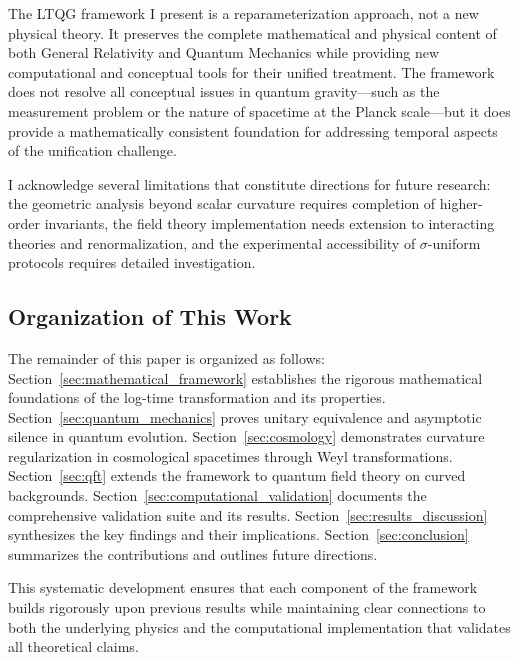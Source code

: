 The LTQG framework I present is a reparameterization approach, not a new physical theory. It preserves the complete mathematical and physical content of both General Relativity and Quantum Mechanics while providing new computational and conceptual tools for their unified treatment. The framework does not resolve all conceptual issues in quantum gravity—such as the measurement problem or the nature of spacetime at the Planck scale—but it does provide a mathematically consistent foundation for addressing temporal aspects of the unification challenge.

I acknowledge several limitations that constitute directions for future research: the geometric analysis beyond scalar curvature requires completion of higher-order invariants, the field theory implementation needs extension to interacting theories and renormalization, and the experimental accessibility of $\sigma$-uniform protocols requires detailed investigation.

\subsection{Organization of This Work}

The remainder of this paper is organized as follows: Section~\ref{sec:mathematical_framework} establishes the rigorous mathematical foundations of the log-time transformation and its properties. Section~\ref{sec:quantum_mechanics} proves unitary equivalence and asymptotic silence in quantum evolution. Section~\ref{sec:cosmology} demonstrates curvature regularization in cosmological spacetimes through Weyl transformations. Section~\ref{sec:qft} extends the framework to quantum field theory on curved backgrounds. Section~\ref{sec:computational_validation} documents the comprehensive validation suite and its results. Section~\ref{sec:results_discussion} synthesizes the key findings and their implications. Section~\ref{sec:conclusion} summarizes the contributions and outlines future directions.

This systematic development ensures that each component of the framework builds rigorously upon previous results while maintaining clear connections to both the underlying physics and the computational implementation that validates all theoretical claims.